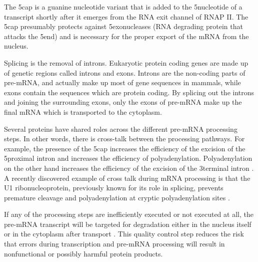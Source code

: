 The 5\p cap is a guanine nucleotide variant that is added to the 5\p nucleotide
of a transcript shortly after it emerges from the RNA exit channel of RNAP II.
The 5\p cap presumably protects against 5\p exonucleases (RNA degrading protein
that attacks the 5\p end) and is necessary for the proper export of the mRNA
from the nucleus.

Splicing is the removal of introns. Eukaryotic protein coding genes are made up
of genetic regions called introns and exons. Introns are the non-coding parts
of pre-mRNA, and actually make up most of gene sequences in mammals, while
exons contain the sequences which are protein coding. By splicing out the
introns and joining the surrounding exons, only the exons of pre-mRNA make up
the final mRNA which is transported to the cytoplasm.

Several proteins have shared roles across the different pre-mRNA processing
steps. In other words, there is cross-talk between the processing pathways. For
example, the presence of the 5\p cap increases the efficiency of the excision
of the 5\p proximal intron and increases the efficiency of polyadenylation.
Polyadenylation on the other hand increases the efficiency of the excision of
the 3\p terminal intron \cite{proudfoot_integrating_2002}. A recently
discovered example of cross talk during mRNA processing is that the U1
ribonucleoprotein, previously known for its role in splicing, prevents
premature cleavage and polyadenylation at cryptic polyadenylation sites
\cite{kaida_u1_2010}.

If any of the processing steps are inefficiently executed or not executed at
all, the pre-mRNA transcript will be targeted for degradation either in the
nucleus itself or in the cytoplasm after transport \cite{doma_rna_2007}. This
quality control step reduces the risk that errors during transcription and
pre-mRNA processing will result in nonfunctional or possibly harmful protein
products.

